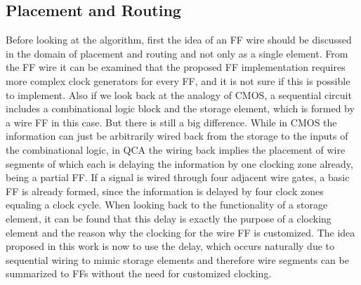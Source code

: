 \subsection{Placement and Routing}
Before looking at the algorithm, first the idea of an FF wire should be discussed in the domain of placement and routing and not only as a single element. From the FF wire it can be examined that the proposed FF implementation requires more complex clock generators for every FF, and it is not sure if this is possible to implement. Also if we look back at the analogy of CMOS, a sequential circuit includes a combinational logic block and the storage element, which is formed by a wire FF in this case. But there is still a big difference. While in CMOS the information can just be arbitrarily wired back from the storage to the inputs of the combinational logic, in QCA the wiring back implies the placement of wire segments of which each is delaying the information by one clocking zone already, being a partial FF. If a signal is wired through four adjacent wire gates, a basic FF is already formed, since the information is delayed by four clock zones equaling a clock cycle. When looking back to the functionality of a storage element, it can be found that this delay is exactly the purpose of a clocking element and the reason why the clocking for the wire FF is customized. The idea proposed in this work is now to use the delay, which occurs naturally due to sequential wiring to mimic storage elements and therefore wire segments can be summarized to FFs without the need for customized clocking. 

